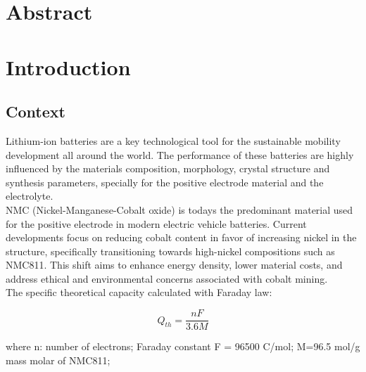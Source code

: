 \documentclass{article}
\begin{document}
{\date{
  \vspace{2cm}
  \small{January 24, 2024}
}




\maketitle
\newpage
\setcounter{page}{1}  %
\tableofcontents

\listoffigures

\listoftables

\section{Abstract}
\section {Introduction}

\subsection{Context}

Lithium-ion batteries are a key technological tool for the sustainable mobility development all around the world. The performance of these batteries are highly influenced by the materials composition, morphology, crystal structure and synthesis parameters, specially for the positive electrode material and the electrolyte.\cite{topo} \\

NMC (Nickel-Manganese-Cobalt oxide) is todays the predominant material used for the positive electrode in modern electric vehicle batteries. Current developments focus on reducing cobalt content in favor of increasing nickel in the structure, specifically transitioning towards high-nickel compositions such as NMC811. This shift aims to enhance energy density, lower material costs, and address ethical and environmental concerns associated with cobalt mining. \cite{NMC811} \cite{NMCintro} \\

The specific theoretical capacity calculated with Faraday law:

\begin{equation}
Q_{th} = \frac{n F}{3.6 M} 
\end{equation}

where n: number of electrons;
Faraday constant F = 96500 C/mol;
M=96.5 mol/g mass molar of NMC811;

}
\end{document}

